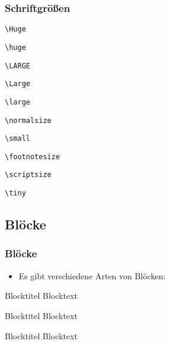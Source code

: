 \begin{frame}[fragile]
	\frametitle{Schriftgrößen}
	
	\Huge
	\verb!\Huge!
	\normalsize
	
	\huge
	\verb!\huge!
	\normalsize
	
	\LARGE
	\verb!\LARGE!
	\normalsize
	
	\Large
	\verb!\Large!
	\normalsize
	
	\large
	\verb!\large!
	\normalsize
	
	\normalsize
	\verb!\normalsize!
	\normalsize
	
	\small
	\verb!\small!
	\normalsize
	
	\footnotesize
	\verb!\footnotesize!
	\normalsize
	
	\scriptsize
	\verb!\scriptsize!
	\normalsize
	
	\tiny
	\verb!\tiny!
	\normalsize
\end{frame}


\subsection{Blöcke}


\begin{frame}[t]
	\frametitle{Blöcke}
	\begin{itemize}
		\item Es gibt verschiedene Arten von Blöcken:
	\end{itemize}
	\begin{block}{Blocktitel}
		Blocktext
	\end{block}
	
	\begin{exampleblock}{Blocktitel}
		Blocktext
	\end{exampleblock}
	
	\begin{alertblock}{Blocktitel}
		Blocktext
	\end{alertblock}
\end{frame}



